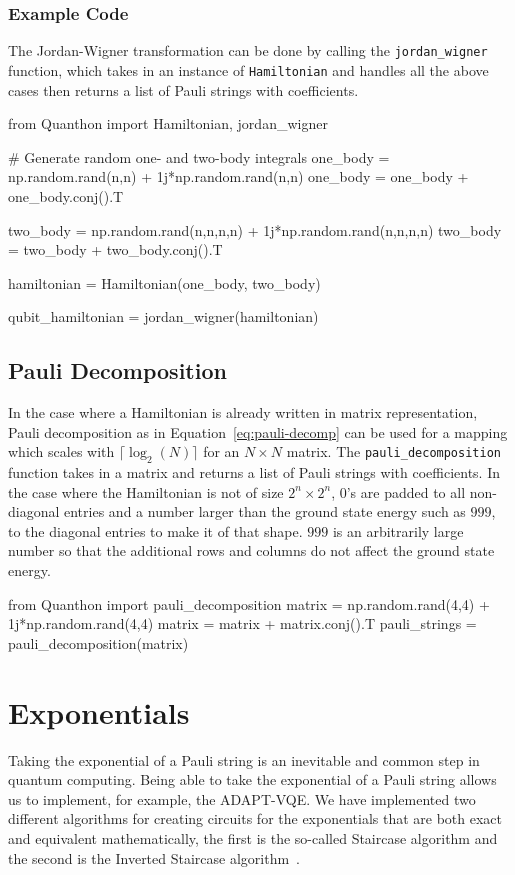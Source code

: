 \subsubsection{Example Code}%
\label{ssub:jw-example}
The Jordan-Wigner transformation can be done by calling the \texttt{jordan\_wigner} function, which takes in an instance of \texttt{Hamiltonian} and handles all the above cases then returns a list of Pauli strings with coefficients. 
\newpage
\begin{mycode}	
	from Quanthon import Hamiltonian, jordan_wigner

	# Generate random one- and two-body integrals
	one_body = np.random.rand(n,n) + 1j*np.random.rand(n,n)
    	one_body = one_body + one_body.conj().T

    	two_body = np.random.rand(n,n,n,n) + 1j*np.random.rand(n,n,n,n)
    	two_body = two_body + two_body.conj().T

	hamiltonian = Hamiltonian(one_body, two_body)

	qubit_hamiltonian = jordan_wigner(hamiltonian)
\end{mycode}

\subsection{Pauli Decomposition}
\label{sub:pauli-decomposition-mapper}
In the case where a Hamiltonian is already written in matrix representation, Pauli decomposition as in Equation~\eqref{eq:pauli-decomp} can be used for a mapping which scales with $\lceil \log_2(N) \rceil$ for an $ N\times N $ matrix. The \texttt{pauli\_decomposition} function takes in a matrix and returns a list of Pauli strings with coefficients. In the case where the Hamiltonian is not of size $2^n \times 2^n$, $0$'s are padded to all non-diagonal entries and a number larger than the ground state energy such as $999$, to the diagonal entries to make it of that shape. $ 999 $ is an arbitrarily large number so that the additional rows and columns do not affect the ground state energy.
\begin{mycode}
	from Quanthon import pauli_decomposition
	matrix = np.random.rand(4,4) + 1j*np.random.rand(4,4)
	matrix = matrix + matrix.conj().T
	pauli_strings = pauli_decomposition(matrix)
\end{mycode}

\section{Exponentials}
\label{sec:exp}
Taking the exponential of a Pauli string is an inevitable and common step in quantum computing. Being able to take the exponential of a Pauli string allows us to implement, for example, the ADAPT-VQE. We have implemented two different algorithms for creating circuits for the exponentials that are both exact and equivalent mathematically, the first is the so-called Staircase algorithm and the second is the Inverted Staircase algorithm~\cite{Mansky2023}.
